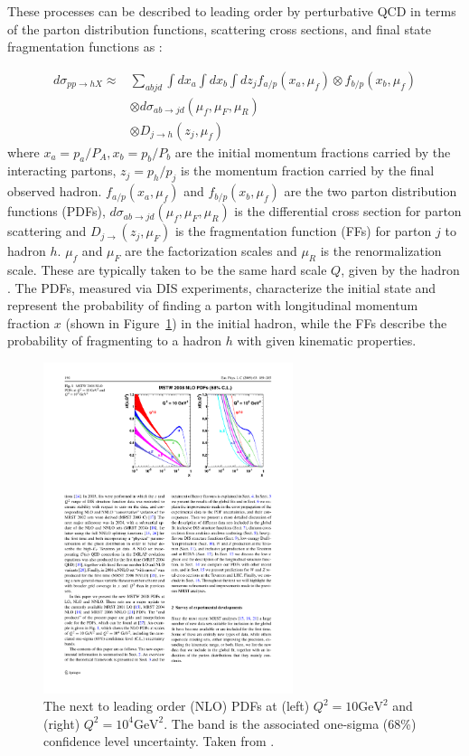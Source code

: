 These processes can be described to leading order by perturbative QCD in terms of the parton distribution functions, scattering cross sections, and final state fragmentation functions as \cite{Qin:2015srf}:

\begin{align}
\label{eq:hadronCS}
d \sigma_{pp \rightarrow hX} \approx & \sum_{abjd} \int dx_a \int dx_b \int dz_j f_{a/p} (x_a, \mu_f) \otimes f_{b/p} (x_b, \mu_f) \\
& \otimes d\sigma_{ab\rightarrow jd} (\mu_f, \mu_F, \mu_R)  \nonumber \\
& \otimes D_{j \rightarrow h} (z_j, \mu_f) \nonumber
\end{align}
where $x_a = p_a/P_A, x_b = p_b / P_b$ are the initial momentum fractions carried by the interacting partons, $z_j = p_h / p_j$ is the momentum fraction carried by the final observed hadron.
$f_{a/p} (x_a, \mu_f)$ and $f_{b/p} (x_b, \mu_f)$ are the two parton distribution functions (PDFs), $d\sigma_{ab\rightarrow jd} (\mu_f, \mu_F, \mu_R)$ is the differential cross section for parton scattering and $D_{j\rightarrow }(z_j,\mu_F)$ is the fragmentation function (FFs) for parton $j$ to hadron $h$.
$\mu_f$ and $\mu_F$ are the factorization scales and $\mu_R$ is the renormalization scale.
These are typically taken to be the same hard scale $Q$, given by the hadron \pt.
The PDFs, measured via DIS experiments, characterize the initial state and represent the probability of finding a parton with longitudinal momentum fraction $x$ (shown in Figure~\ref{fig:bjorkenX}) in the initial hadron, while the FFs describe the probability of fragmenting to a hadron $h$ with given kinematic properties.

\begin{figure}[htbp]
\begin{center}
\includegraphics[width=0.65\textwidth]{figures/theory/bjorkenX}
\caption{The next to leading order (NLO) PDFs at (left) $Q^2 = 10 \mathrm{GeV}^2$ and (right) $Q^2 = 10^4 \mathrm{GeV}^2$.
The band is the associated one-sigma (68\%) confidence level uncertainty.
Taken from \cite{Martin2009}.}
\label{fig:bjorkenX}
\end{center}
\end{figure}
 
